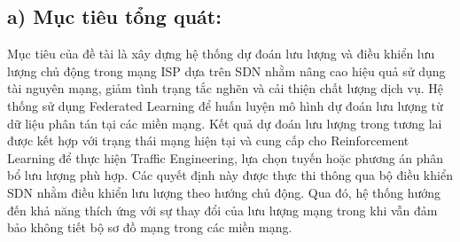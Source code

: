 
\subsection*{a) Mục tiêu tổng quát:}
Mục tiêu của đề tài là xây dựng hệ thống dự đoán lưu lượng và điều khiển lưu lượng chủ động trong mạng ISP dựa trên SDN nhằm nâng cao hiệu quả sử dụng tài nguyên mạng, giảm tình trạng tắc nghẽn và cải thiện chất lượng dịch vụ. Hệ thống sử dụng Federated Learning để huấn luyện mô hình dự đoán lưu lượng từ dữ liệu phân tán tại các miền mạng. Kết quả dự đoán lưu lượng trong tương lai được kết hợp với trạng thái mạng hiện tại và cung cấp cho Reinforcement Learning để thực hiện Traffic Engineering, lựa chọn tuyến hoặc phương án phân bổ lưu lượng phù hợp. Các quyết định này được thực thi thông qua bộ điều khiển SDN nhằm điều khiển lưu lượng theo hướng chủ động. Qua đó, hệ thống hướng đến khả năng thích ứng với sự thay đổi của lưu lượng mạng trong khi vẫn đảm bảo không tiết bộ sơ đồ mạng trong các miền mạng.

